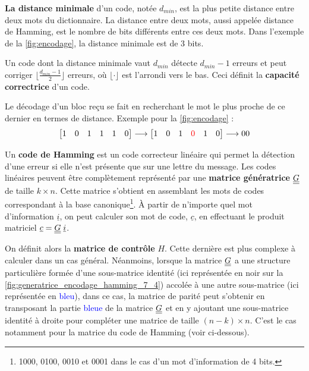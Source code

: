\documentclass [a4paper, 11pt] {article}
\begin{document}
    \textbf{La distance minimale} d'un code, notée $d_{min}$, est la plus petite distance entre deux mots du dictionnaire. La distance entre deux mots, aussi appelée distance de Hamming, est le nombre de bits différents entre ces deux mots. Dans l'exemple de la \autoref{fig:encodage}, la distance minimale est de 3 bits.
    
    Un code dont la distance minimale vaut $d_{min}$ détecte $d_{min}-1$ erreurs et peut corriger $\lfloor\frac{d_{min}-1}{2} \rfloor$ erreurs, où $\lfloor \cdot \rfloor$ est l'arrondi vers le bas. Ceci définit la \textbf{capacité correctrice} d'un code.
    
    Le décodage d'un bloc reçu se fait en recherchant le mot le plus proche de ce dernier en termes de distance. Exemple pour la \autoref{fig:encodage} :
    \begin{equation}
        \begin{bmatrix}
            1 & 0 & 1 & 1 & 1 & 0
        \end{bmatrix}
        \longrightarrow
        \begin{bmatrix}
            1 & 0 & 1 & \color{red} 0 & 1 & 0
        \end{bmatrix}
        \longrightarrow 00
    \end{equation}
    
    Un \textbf{code de Hamming} est un code correcteur linéaire qui permet la détection d'une erreur si elle n'est présente que sur une lettre du message. Les codes linéaires peuvent être complètement représenté par une \textbf{matrice génératrice} $\underline{\underline{G}}$ de taille $k \times n$. Cette matrice s'obtient en assemblant les mots de codes correspondant à la base canonique\footnote{1000, 0100, 0010 et 0001 dans le cas d'un mot d'information de 4 bits.}. À partir de n'importe quel mot d'information $\underline{i}$, on peut calculer son mot de code, $\underline{c}$, en effectuant le produit matriciel $\underline{c} = \underline{\underline{G}} \; \underline{i}$.
    
    \pagebreak
    \pagestyle{nextpages}
    
    On définit alors la \textbf{matrice de contrôle} $H$. Cette dernière est plus complexe à calculer dans un cas général. Néanmoins, lorsque la matrice $\underline{\underline{G}}$ a une structure particulière formée d'une sous-matrice identité (ici représentée en noir sur la \autoref{fig:generatrice_encodage_hamming_7_4}) accolée à une autre sous-matrice (ici représentée en \textcolor{blue}{bleu}), dans ce cas, la matrice de parité  peut s'obtenir en transposant la partie \textcolor{blue}{bleue} de la matrice $\underline{\underline{G}}$ et en y ajoutant une sous-matrice identité à droite pour compléter une matrice de taille $(n-k) \times n$. C'est le cas notamment pour la matrice du code de Hamming (voir ci-dessous).
    
\end{document}
